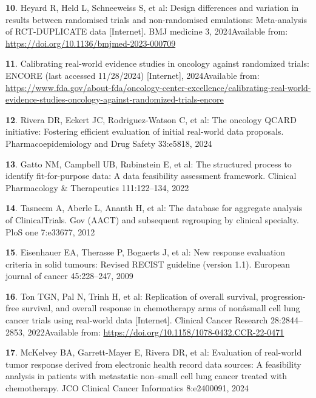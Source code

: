 \documentclass[
  letterpaper,
  DIV=11,
  numbers=noendperiod]{scrartcl}
\newlength{\cslhangindent}
\newenvironment{CSLReferences}[2] %
 {\begin{list}{}{%
  \setlength{\itemindent}{0pt}
  \setlength{\leftmargin}{0pt}
  \setlength{\parsep}{0pt}
  \ifodd #1
   \setlength{\leftmargin}{\cslhangindent}
   \setlength{\itemindent}{-1\cslhangindent}
  \fi
  \setlength{\itemsep}{#2\baselineskip}}}
 {\end{list}}
\begin{document}
\begin{CSLReferences}{0}{1}
\textbf{10}. Heyard R, Held L, Schneeweiss S, et al: Design differences
and variation in results between randomised trials and non-randomised
emulations: Meta-analysis of RCT-DUPLICATE data {[}Internet{]}. BMJ
medicine 3, 2024Available from:
\url{https://doi.org/10.1136/bmjmed-2023-000709}

\textbf{11}. Calibrating real-world evidence studies in oncology against
randomized trials: ENCORE (last accessed 11/28/2024) {[}Internet{]},
2024Available from:
\url{https://www.fda.gov/about-fda/oncology-center-excellence/calibrating-real-world-evidence-studies-oncology-against-randomized-trials-encore}

\textbf{12}. Rivera DR, Eckert JC, Rodriguez-Watson C, et al: The
oncology QCARD initiative: Fostering efficient evaluation of initial
real-world data proposals. Pharmacoepidemiology and Drug Safety
33:e5818, 2024

\textbf{13}. Gatto NM, Campbell UB, Rubinstein E, et al: The structured
process to identify fit-for-purpose data: A data feasibility assessment
framework. Clinical Pharmacology \& Therapeutics 111:122--134, 2022

\textbf{14}. Tasneem A, Aberle L, Ananth H, et al: The database for
aggregate analysis of ClinicalTrials. Gov (AACT) and subsequent
regrouping by clinical specialty. PloS one 7:e33677, 2012

\textbf{15}. Eisenhauer EA, Therasse P, Bogaerts J, et al: New response
evaluation criteria in solid tumours: Revised RECIST guideline (version
1.1). European journal of cancer 45:228--247, 2009

\textbf{16}. Ton TGN, Pal N, Trinh H, et al: Replication of overall
survival, progression-free survival, and overall response in
chemotherapy arms of nonâsmall cell lung cancer trials using real-world
data {[}Internet{]}. Clinical Cancer Research 28:2844--2853,
2022Available from: \url{https://doi.org/10.1158/1078-0432.CCR-22-0471}

\textbf{17}. McKelvey BA, Garrett-Mayer E, Rivera DR, et al: Evaluation
of real-world tumor response derived from electronic health record data
sources: A feasibility analysis in patients with metastatic non--small
cell lung cancer treated with chemotherapy. JCO Clinical Cancer
Informatics 8:e2400091, 2024


\end{CSLReferences}
\end{document}
